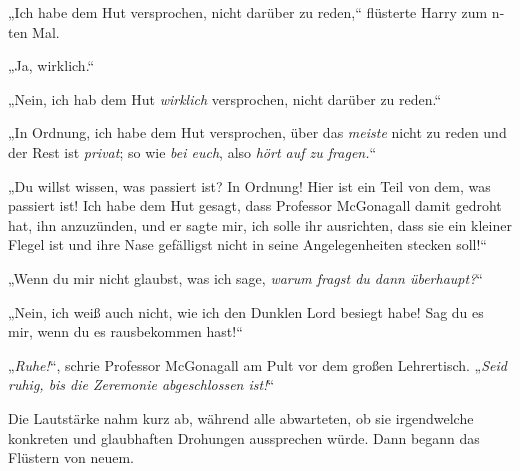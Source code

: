 „Ich habe dem Hut versprochen, nicht darüber zu reden,“ flüsterte Harry zum n-ten Mal.

„Ja, wirklich.“

„Nein, ich hab dem Hut \emph{wirklich} versprochen, nicht darüber zu reden.“

„In Ordnung, ich habe dem Hut versprochen, über das \emph{meiste} nicht zu reden und der Rest ist \emph{privat}; so wie \emph{bei euch}, also \emph{hört auf zu fragen.}“

„Du willst wissen, was passiert ist? In Ordnung! Hier ist ein Teil von dem, was passiert ist! Ich habe dem Hut gesagt, dass Professor McGonagall damit gedroht hat, ihn anzuzünden, und er sagte mir, ich solle ihr ausrichten, dass sie ein kleiner Flegel ist und ihre Nase gefälligst nicht in seine Angelegenheiten stecken soll!“

„Wenn du mir nicht glaubst, was ich sage, \emph{warum fragst du dann überhaupt?}“

„Nein, ich weiß auch nicht, wie ich den Dunklen Lord besiegt habe! Sag du es mir, wenn du es rausbekommen hast!“

„\emph{Ruhe!}“, schrie Professor McGonagall am Pult vor dem großen Lehrertisch. „\emph{Seid ruhig, bis die Zeremonie abgeschlossen ist!}“

Die Lautstärke nahm kurz ab, während alle abwarteten, ob sie irgendwelche konkreten und glaubhaften Drohungen aussprechen würde. Dann begann das Flüstern von neuem.

